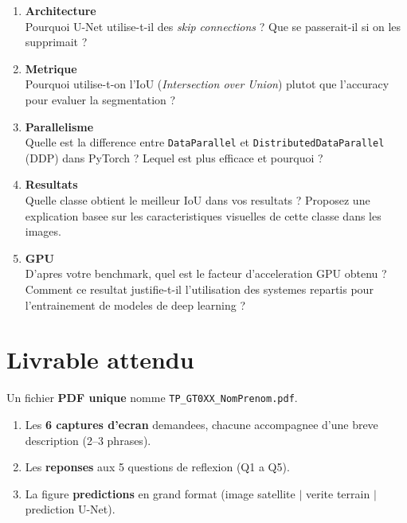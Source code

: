 \documentclass[12pt,a4paper]{article}
\begin{document}
\begin{questionbox}
  \begin{enumerate}[leftmargin=*, label=\textbf{Q\arabic*.}, itemsep=12pt]

    \item \textbf{Architecture} \\
          Pourquoi U-Net utilise-t-il des \textit{skip connections} ?
          Que se passerait-il si on les supprimait ?

    \item \textbf{Metrique} \\
          Pourquoi utilise-t-on l'IoU (\textit{Intersection over Union})
          plutot que l'accuracy pour evaluer la segmentation ?

    \item \textbf{Parallelisme} \\
          Quelle est la difference entre \texttt{DataParallel} et
          \texttt{DistributedDataParallel} (DDP) dans PyTorch ?
          Lequel est plus efficace et pourquoi ?

    \item \textbf{Resultats} \\
          Quelle classe obtient le meilleur IoU dans vos resultats ?
          Proposez une explication basee sur les caracteristiques
          visuelles de cette classe dans les images.

    \item \textbf{GPU} \\
          D'apres votre benchmark, quel est le facteur d'acceleration
          GPU obtenu ? Comment ce resultat justifie-t-il l'utilisation
          des systemes repartis pour l'entrainement de modeles de
          deep learning ?

  \end{enumerate}
\end{questionbox}

\section{Livrable attendu}

\begin{warningbox}
  Un fichier \textbf{PDF unique} nomme \texttt{TP\_GT0XX\_NomPrenom.pdf}.
\end{warningbox}

\begin{enumerate}[leftmargin=*, label=\textbf{\arabic*.}, itemsep=4pt]
  \item Les \textbf{6 captures d'ecran} demandees, chacune accompagnee
        d'une breve description (2--3 phrases).
  \item Les \textbf{reponses} aux 5 questions de reflexion (Q1 a Q5).
  \item La figure \textbf{predictions} en grand format
        (image satellite $|$ verite terrain $|$ prediction U-Net).
\end{enumerate}
\end{document}

